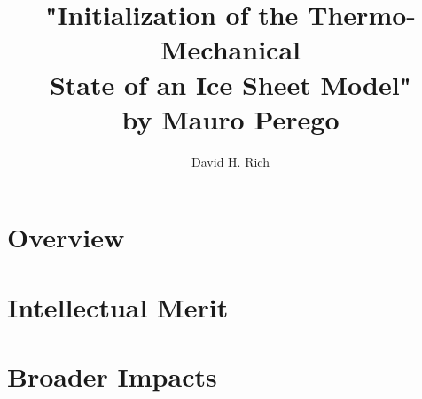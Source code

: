\documentclass{article}
\title{ "Initialization of the Thermo-Mechanical \\
	State of an Ice Sheet Model" \\ 
	by Mauro Perego \\ }
\author{David H. Rich}
\date{}
\begin{document}
	\maketitle%
	\thispagestyle{empty}
	\vspace{16pt}
	
	\section{Overview}
	
	
	\section{Intellectual Merit}
	
	  
	\section{Broader Impacts}
	
\end{document}
